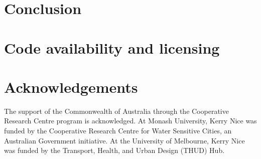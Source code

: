 \documentclass[final,3p,times,authoryear]{elsarticle}
\begin{document}












\section{Conclusion}\label{sec:conclusion}


\section{Code availability and licensing}\label{sec:available}





\section*{Acknowledgements}
The support of the Commonwealth of Australia through the Cooperative Research Centre program is acknowledged. At Monash University, Kerry Nice was funded by the Cooperative Research Centre for Water Sensitive Cities, an Australian Government initiative. At the University of Melbourne, Kerry Nice was funded by the Transport, Health, and Urban Design (THUD) Hub. 
 
\end{document}
